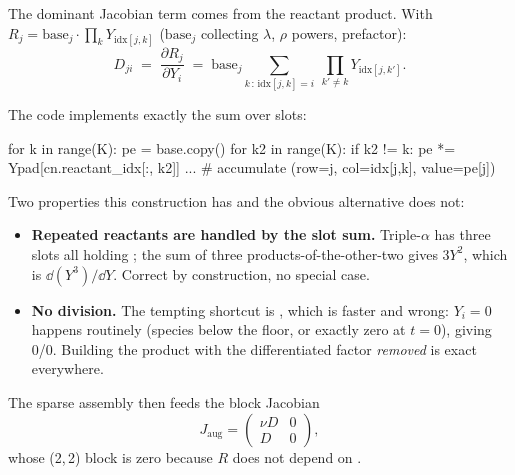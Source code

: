 The dominant Jacobian term comes from the reactant product. With
$R_j = \mathrm{base}_j \cdot \prod_{k} Y_{\mathrm{idx}[j,k]}$
($\mathrm{base}_j$ collecting $\lambda$, $\rho$ powers, prefactor):
%
\begin{equation}
D_{ji} \;=\; \frac{\partial R_j}{\partial Y_i}
\;=\; \mathrm{base}_j \sum_{k\,:\,\mathrm{idx}[j,k]=i}\
      \prod_{k'\neq k} Y_{\mathrm{idx}[j,k']}.
\label{eq:dRdY}
\end{equation}

The code implements exactly the sum over slots:

\begin{srclisting}
for k in range(K):
    pe = base.copy()
    for k2 in range(K):
        if k2 != k:
            pe *= Ypad[cn.reactant_idx[:, k2]]
    ...  # accumulate (row=j, col=idx[j,k], value=pe[j])
\end{srclisting}

Two properties this construction has and the obvious alternative does not:

\begin{itemize}
\item \textbf{Repeated reactants are handled by the slot sum.}
  Triple-$\alpha$ has three slots all holding ; the sum of three
  products-of-the-other-two gives $3Y^2$, which is $\dd(Y^3)/\dd Y$. Correct by
  construction, no special case.
\item \textbf{No division.} The tempting shortcut is , which is
  faster and wrong: $Y_i = 0$ happens routinely (species below the floor, or
  exactly zero at $t = 0$), giving 0/0. Building the product with the
  differentiated factor \emph{removed} is exact everywhere.
\end{itemize}

The sparse assembly  then feeds the block Jacobian
%
\begin{equation}
J_{\mathrm{aug}} = \begin{pmatrix}\nu D & 0\\ D & 0\end{pmatrix},
\label{eq:jaug}
\end{equation}
%
whose (2,\,2) block is zero because $R$ does not depend on \Phifl.

